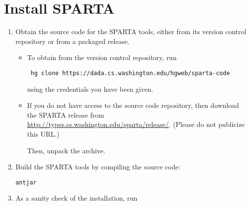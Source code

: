 \section{Install SPARTA\label{sec:install}}

\begin{enumerate}

\item
  Obtain the source code for the SPARTA tools, either from its version
  control repository or from a packaged release.

\begin{itemize}
\item
  To obtain from the version control repository, run
\begin{Verbatim}
 hg clone https://dada.cs.washington.edu/hgweb/sparta-code
\end{Verbatim}
  using the credentials you have been given.
\item 
  If you do not have access to the source code repository, then
  download the SPARTA release from
  \url{http://types.cs.washington.edu/sparta/release/}.  (Please do not
  publicize this URL.)  

  Then, unpack the archive.
\end{itemize}

%
%
%
%
%


\item Build the SPARTA tools by compiling the source code:
\begin{alltt}
ant jar
\end{alltt}

\item
As a sanity check of the installation, run


\end{enumerate}
